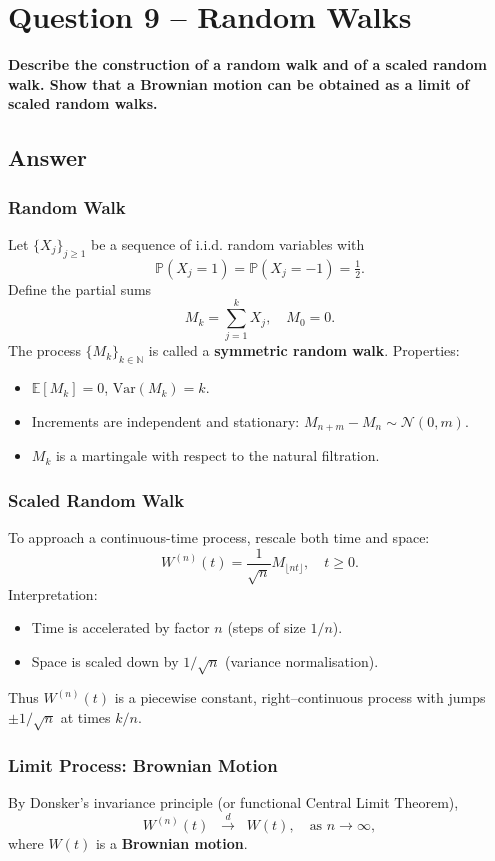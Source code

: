 \documentclass[12pt,a4paper]{book}
\theoremstyle{remark}
\newcommand{\PP}{\mathbb{P}}          %
\newcommand{\EE}{\mathbb{E}}          %
\newcommand{\NN}{\mathbb{N}}
\newcommand{\Var}{\mathrm{Var}}       %
\newcommand{\Normal}{\mathcal{N}}
\begin{document}
\newpage
\section{Question 9 -- Random Walks}
\textbf{Describe the construction of a random walk and of a scaled random walk. Show that a Brownian motion can be obtained as a limit of scaled random walks.}

\subsection*{Answer}

\subsubsection*{Random Walk}
Let $\{X_j\}_{j\geq 1}$ be a sequence of i.i.d. random variables with
\[
\PP(X_j = 1) = \PP(X_j = -1) = \tfrac{1}{2}.
\]
Define the partial sums
\[
M_k = \sum_{j=1}^k X_j, \quad M_0=0.
\]
The process $\{M_k\}_{k\in\NN}$ is called a \textbf{symmetric random walk}.  
Properties:
\begin{itemize}
    \item $\EE[M_k] = 0$, $\Var(M_k) = k$.
    \item Increments are independent and stationary: $M_{n+m}-M_n \sim \Normal(0,m)$.
    \item $M_k$ is a martingale with respect to the natural filtration.
\end{itemize}

\subsubsection*{Scaled Random Walk}
To approach a continuous-time process, rescale both time and space:
\[
W^{(n)}(t) = \frac{1}{\sqrt{n}} M_{\lfloor nt \rfloor}, \quad t \ge 0.
\]
Interpretation:
\begin{itemize}
    \item Time is accelerated by factor $n$ (steps of size $1/n$).
    \item Space is scaled down by $1/\sqrt{n}$ (variance normalisation).
\end{itemize}
Thus $W^{(n)}(t)$ is a piecewise constant, right–continuous process with jumps $\pm 1/\sqrt{n}$ at times $k/n$.

\subsubsection*{Limit Process: Brownian Motion}
By Donsker’s invariance principle (or functional Central Limit Theorem),
\[
W^{(n)}(t) \;\; \xrightarrow{d}\;\; W(t), \quad \text{as } n\to\infty,
\]
where $W(t)$ is a \textbf{Brownian motion}.  
\end{document}
